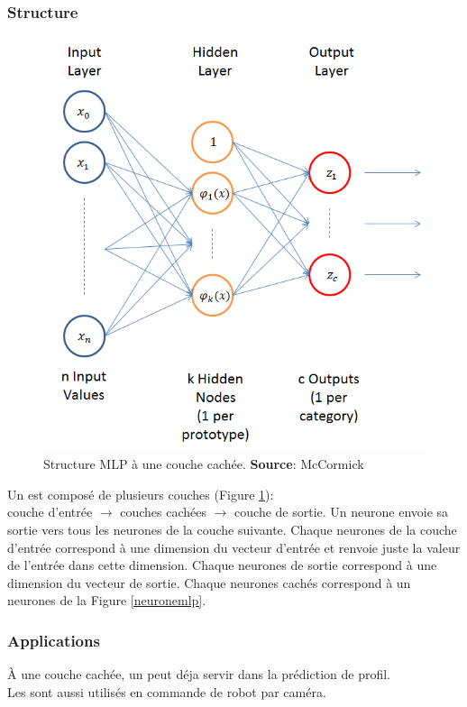 \documentclass[12pt,a4paper,oneside, titlepage]{article}
\begin{document}
\subsubsection*{Structure}
\begin{figure}
 \centering
 \includegraphics[scale=0.5]{../figures/nnstruct.png}
 \caption{Structure MLP à une couche cachée. \textbf{Source}: McCormick\cite{RBFtuto}}
 \label{structuremlp}
\end{figure}
Un \mlp est composé de plusieurs couches (Figure \ref{structuremlp}):\\
couche d'entrée $\rightarrow$ couches cachées $\rightarrow$ couche de sortie.
Un neurone envoie sa sortie vers tous les neurones de la couche suivante.
Chaque neurones de la couche d'entrée correspond à une dimension du vecteur d'entrée et renvoie juste la valeur de l'entrée dans cette dimension.
Chaque neurones de sortie correspond à une dimension du vecteur de sortie. %
Chaque neurones cachés correspond à un neurones de la Figure \ref{neuronemlp}.
\subsubsection*{Applications}
À une couche cachée, un \mlp peut déja servir dans la prédiction de profil.\cite{statistica}\\
Les \mlp sont aussi utilisés en commande de robot par caméra.\cite{Pomerleau}
\end{document}
